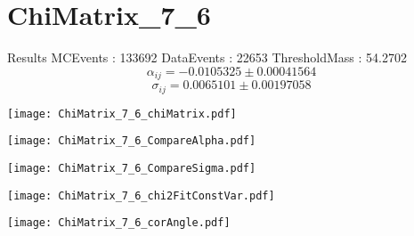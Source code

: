 \documentclass[a4paper,12pt]{article}
\begin{document}
\section{ChiMatrix\_7\_6}
\begin{minipage}{0.49\linewidth} Results \newline
MCEvents : 133692\newline
DataEvents : 22653 \newline
ThresholdMass : 54.2702\\
$$\alpha_{ij} = -0.0105325\pm 0.00041564$$
$$\sigma_{ij} = 0.0065101\pm 0.00197058$$
\end{minipage}\hfill
\begin{minipage}{0.49\linewidth} 
\texttt{[image: ChiMatrix\_7\_6\_chiMatrix.pdf]}\\
\end{minipage}
\hfill
\begin{minipage}{0.49\linewidth} 
\texttt{[image: ChiMatrix\_7\_6\_CompareAlpha.pdf]}\\
\end{minipage}
\hfill
\begin{minipage}{0.49\linewidth} 
\texttt{[image: ChiMatrix\_7\_6\_CompareSigma.pdf]}\\
\end{minipage}
\begin{minipage}{0.49\linewidth} 
\texttt{[image: ChiMatrix\_7\_6\_chi2FitConstVar.pdf]}\\
\end{minipage}
\hfill
\begin{minipage}{0.49\linewidth} 
\texttt{[image: ChiMatrix\_7\_6\_corAngle.pdf]}\\
\end{minipage}
\end{document}
